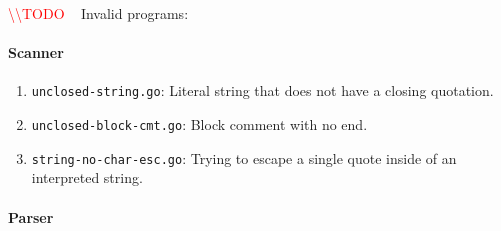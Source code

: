 \documentclass[11pt]{article}
\newcommand{\todo}[0]{\textcolor{red}{\textbackslash\textbackslash TODO \ }}
\begin{document}
\todo%
Invalid programs:
\paragraph{Scanner}
\begin{enumerate}
\item \texttt{unclosed-string.go}: Literal string that does not have a
  closing quotation.
\item \texttt{unclosed-block-cmt.go}: Block comment with no end.
\item \texttt{string-no-char-esc.go}: Trying to escape a single quote
  inside of an interpreted string.
\end{enumerate}
\paragraph{Parser}
\end{document}
